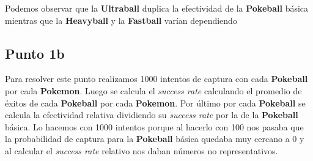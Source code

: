 \documentclass[11pt]{article}
\begin{document}
    \begin{center}
    \end{center}
    { \hspace*{\fill} \\}

    \begin{center}
    \end{center}
    { \hspace*{\fill} \\}

    \begin{center}
    \end{center}
    { \hspace*{\fill} \\}

    \begin{center}
    \end{center}
    { \hspace*{\fill} \\}

    \begin{center}
    \end{center}
    { \hspace*{\fill} \\}

    Podemos observar que la \textbf{Ultraball} duplica la efectividad de la
\textbf{Pokeball} básica mientras que la \textbf{Heavyball} y la
\textbf{Fastball} varían dependiendo

    \subsection{Punto 1b}\label{punto-1b}

Para resolver este punto realizamos 1000 intentos de captura con cada
\textbf{Pokeball} por cada \textbf{Pokemon}. Luego se calcula el
\emph{success rate} calculando el promedio de éxitos de cada
\textbf{Pokeball} por cada \textbf{Pokemon}. Por último por cada
\textbf{Pokeball} se calcula la efectividad relativa dividiendo su
\emph{success rate} por la de la \textbf{Pokeball} básica. Lo hacemos
con 1000 intentos porque al hacerlo con 100 nos pasaba que la
probabilidad de captura para la \textbf{Pokeball} básica quedaba muy
cercano a 0 y al calcular el \emph{success rate} relativo nos daban
números no representativos.
\end{document}
